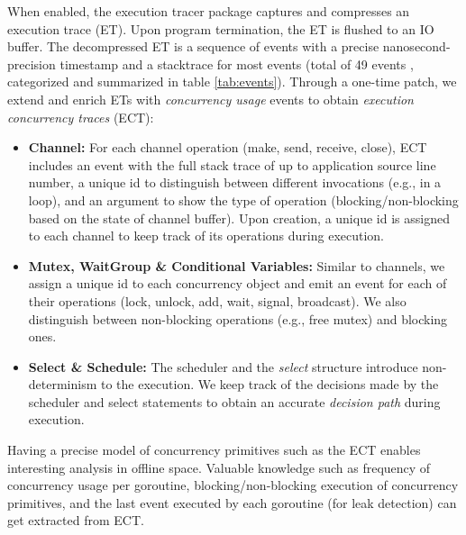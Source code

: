 When enabled, the execution tracer package captures and compresses an execution trace (ET).
%
Upon program termination, the ET is flushed to an IO buffer.
%
The decompressed ET is a sequence of events with a precise nanosecond-precision timestamp and a stacktrace for most events (total of 49 events \cite{goParserSource}, categorized and summarized in table \ref{tab:events}).
%
Through a one-time patch, we extend and enrich ETs with \textit{concurrency usage} events to obtain \textit{execution concurrency traces} (ECT):
\begin{itemize}
    \item \textbf{Channel:} For each channel operation (make, send, receive, close), ECT includes an event with the full stack trace of up to application source line number, a unique id to distinguish between different invocations (e.g., in a loop), and an argument to show the type of operation (blocking/non-blocking based on the state of channel buffer). Upon creation, a unique id is assigned to each channel to keep track of its operations during execution.
    \item \textbf{Mutex, WaitGroup \& Conditional Variables:} Similar to channels, we assign a unique id to each concurrency object and emit an event for each of their operations (lock, unlock, add, wait, signal, broadcast). We also distinguish between non-blocking operations (e.g., free mutex) and blocking ones.
    \item \textbf{Select \& Schedule:} The scheduler and the \textit{select} structure introduce non-determinism to the execution. We keep track of the decisions made by the scheduler and select statements to obtain an accurate \textit{decision path} during execution.
\end{itemize}

Having a precise model of concurrency primitives such as the ECT enables interesting analysis in offline space.
%
Valuable knowledge such as frequency of concurrency usage per goroutine, blocking/non-blocking execution of concurrency primitives, and the last event executed by each goroutine (for leak detection) can get extracted from ECT.


